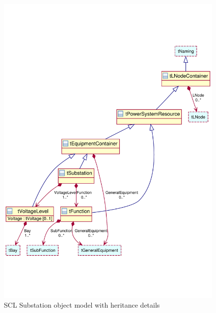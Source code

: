 \begin{figure}
  \includegraphics[width=1.0\linewidth]{chapters/ch-scl/figures/SCL-uml-substation-Deept2}
  \caption{SCL Substation object model with heritance 
  details  } 
  \label{fig:pdf-SCL-uml-substation-Deept2}
\end{figure}


